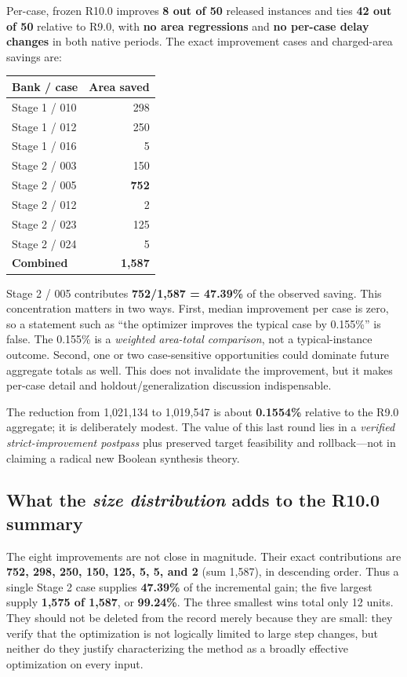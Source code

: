 Per-case, frozen R10.0 improves \textbf{8 out of 50} released instances and ties \textbf{42 out of 50} relative to R9.0, with \textbf{no area regressions} and \textbf{no per-case delay changes} in both native periods. The exact improvement cases and charged-area savings are:

\begin{longtable}[]{@{}lr@{}}
\toprule\noalign{}
Bank / case & Area saved \\
\midrule\noalign{}
\endhead
\bottomrule\noalign{}
\endlastfoot
Stage 1 / 010 & 298 \\
Stage 1 / 012 & 250 \\
Stage 1 / 016 & 5 \\
Stage 2 / 003 & 150 \\
Stage 2 / 005 & \textbf{752} \\
Stage 2 / 012 & 2 \\
Stage 2 / 023 & 125 \\
Stage 2 / 024 & 5 \\
\textbf{Combined} & \textbf{1,587} \\
\end{longtable}

Stage 2 / 005 contributes \textbf{752/1,587 = 47.39\%} of the observed saving. This concentration matters in two ways. First, median improvement per case is zero, so a statement such as ``the optimizer improves the typical case by 0.155\%'' is false. The 0.155\% is a \emph{weighted area-total comparison}, not a typical-instance outcome. Second, one or two case-sensitive opportunities could dominate future aggregate totals as well. This does not invalidate the improvement, but it makes per-case detail and holdout/generalization discussion indispensable.

The reduction from 1,021,134 to 1,019,547 is about \textbf{0.1554\%} relative to the R9.0 aggregate; it is deliberately modest. The value of this last round lies in a \emph{verified strict-improvement postpass} plus preserved target feasibility and rollback---not in claiming a radical new Boolean synthesis theory.

\subsection{\texorpdfstring{What the \emph{size distribution} adds to the R10.0 summary}{What the size distribution adds to the R10.0 summary}}\label{a-what-the-size-distribution-adds-to-the-r10.0-summary}

The eight improvements are not close in magnitude. Their exact contributions are \textbf{752, 298, 250, 150, 125, 5, 5, and 2} (sum 1,587), in descending order. Thus a single Stage 2 case supplies \textbf{47.39\%} of the incremental gain; the five largest supply \textbf{1,575 of 1,587}, or \textbf{99.24\%}. The three smallest wins total only 12 units. They should not be deleted from the record merely because they are small: they verify that the optimization is not logically limited to large step changes, but neither do they justify characterizing the method as a broadly effective optimization on every input.

